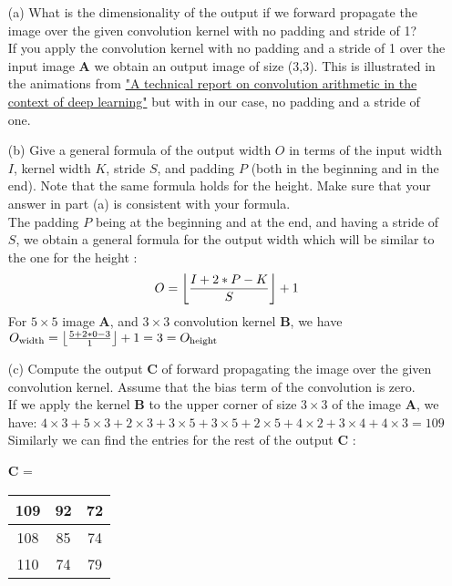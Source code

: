 \documentclass[11pt]{article}
\DeclarePairedDelimiter\floor{\lfloor}{\rfloor}
\newcommand{\0}{\mat{0}}
\newcommand{\matr}[1]{\bm{#1}}     %
\begin{document}
\begin{itemize}
    \item[(a)] What is the dimensionality of the output if we forward propagate the image over the given convolution kernel with no padding and stride of 1? \\
    
     \smallskip
    If you apply the convolution kernel with no padding and a stride of 1 over the input image  $\matr{A}$ we obtain an output image of size (3,3).
    This is illustrated in the animations  from \href{https://github.com/vdumoulin/conv_arithmetic} {"A technical report on convolution arithmetic in the context of deep learning"}
    but with in our case, no padding and a stride of one.
    
    \item[(b)] Give a general formula of the output width $O$ in terms of the input width $I$, kernel width $K$, stride $S$, and padding $P$ (both in the beginning and in the end). Note that the same formula holds for the height. Make sure that your answer in part (a) is consistent with your formula. \\
    
    \smallskip
    The padding $P$ being at the beginning and at the end, and having a stride of $S$, we obtain a general formula for the output width which will be similar to the one for the height :
    \[
    	O  = \floor*{\frac{I + 2 * P - K}{S}} + 1 
    \]
    For   $5\times 5$ image $\matr{A}$, and $3\times 3$  convolution kernel $\matr{B}$, we have $O_{\text{width}} =  \floor*{\frac{5 + 2 * 0 - 3}{1}} + 1 = 3 = O_{\text{height}}$
    
    \item[(c)] Compute the output $\matr{C}$ of forward propagating the image over the
given convolution kernel. Assume that the bias term of the convolution is zero.\\

	\smallskip
	If we apply the kernel $\matr{B}$ to the upper corner of size   $3\times 3$ of the image $\matr{A}$, we have: 
	$4 \times 3 + 5 \times 3 + 2 \times 3 + 3 \times 5 +  3 \times 5 + 2 \times 5 + 4 \times 2 + 3 \times 4 + 4 \times 3 = 109$
	Similarly we can find the entries for the rest of the output $\matr{C}$ :

	    \begin{table}[!ht]
		    \centering
    		$\matr{C}$ = \begin{tabular}{|c|c|c|} 
    			\hline
			109 & 92 & 72 \\ \hline 
		        108 & 85 & 74 \\ \hline
       			110 & 74 & 79 \\ \hline 
   		 \end{tabular}
    	  \end{table}


\end{itemize}
\end{document}
